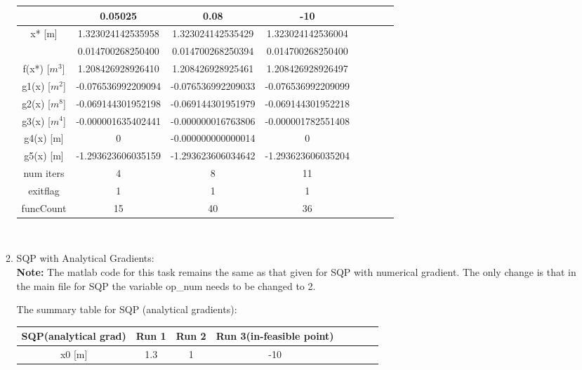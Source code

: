 \documentclass[12pt]{article}
\begin{document}
\begin{enumerate}[I]
\begin{enumerate}[1)]
\begin{tabular}{|c|c|c|c|c|c|c|c|}
	&0.05025&   0.08 &-10\\
\hline	
x* [m]&	 1.323024142535958&	1.323024142535429 &     1.323024142536004    \\
	&0.014700268250400 &	0.014700268250394 &    0.014700268250400     \\
\hline
f(x*) [$m^3$]&	1.208426928926410&	1.208426928925461 &     1.208426928926497    \\
\hline
g1(x) [$m^2$]&	-0.076536992209094 &	-0.076536992209033 &      -0.076536992209099   \\
g2(x) [$m^8$]	&-0.069144301952198&	-0.069144301951979 &     -0.069144301952218    \\
g3(x) [$m^4$]&	-0.000001635402441&	-0.000000016763806 &    -0.000001782551408     \\
g4(x) [m]	&0 &	-0.000000000000014 &    0     \\
g5(x) [m]	& -1.293623606035159&	-1.293623606034642 &    -1.293623606035204     \\
\hline
num iters & 4 &	8 &11\\
\hline
exitflag&	1&	1 &1\\
\hline
funcCount &15 &40 &36\\
\hline
\end{tabular}\\


\item SQP with Analytical Gradients:\\
\textbf{Note:} The matlab code for this task remains the same as that given for SQP with numerical gradient. The only change is that in the main file for SQP the variable op\_num needs to be changed to 2.
 
The summary table for SQP (analytical gradients):\\
\begin{tabular}{|c|c|c|c|c|c|c|c|}
\hline 
SQP(analytical grad) &	Run 1 &	Run 2 & Run 3(in-feasible point) \\
\hline
x0 [m]&	1.3&	1 & -10\\


\end{tabular}
\end{enumerate}
\end{enumerate}
\end{document}
